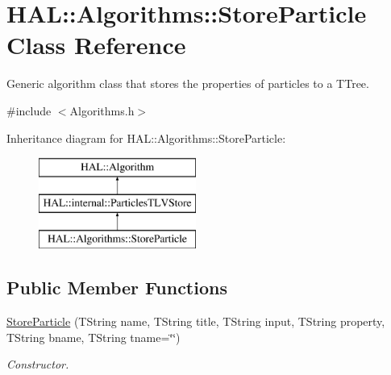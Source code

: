 \hypertarget{class_h_a_l_1_1_algorithms_1_1_store_particle}{\section{H\+A\+L\+:\+:Algorithms\+:\+:Store\+Particle Class Reference}
\label{class_h_a_l_1_1_algorithms_1_1_store_particle}
}


Generic algorithm class that stores the properties of particles to a T\+Tree.  




{\ttfamily \#include $<$Algorithms.\+h$>$}

Inheritance diagram for H\+A\+L\+:\+:Algorithms\+:\+:Store\+Particle\+:\begin{figure}[H]
\begin{center}
\leavevmode
\includegraphics[height=3.000000cm]{class_h_a_l_1_1_algorithms_1_1_store_particle}
\end{center}
\end{figure}
\subsection*{Public Member Functions}
\begin{DoxyCompactItemize}
\item 
\hyperlink{class_h_a_l_1_1_algorithms_1_1_store_particle_a160a46b43875d8968e865fc2335380f3}{Store\+Particle} (T\+String name, T\+String title, T\+String input, T\+String property, T\+String bname, T\+String tname=\char`\"{}\char`\"{})
\begin{DoxyCompactList}\small\item\em Constructor. \end{DoxyCompactList}\end{DoxyCompactItemize}
